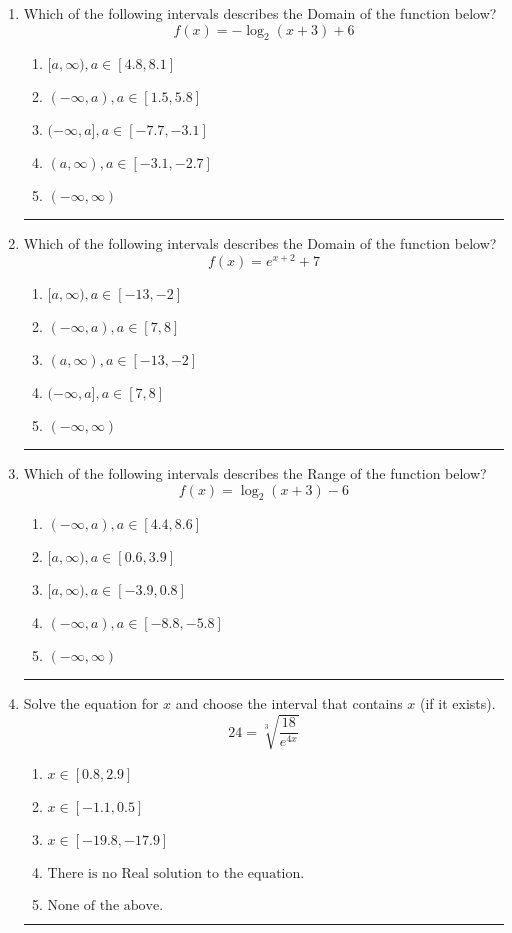 \documentclass[14pt]{extbook}
\newcommand{\litem}[1]{\item#1\hspace*{-1cm}\rule{\textwidth}{0.4pt}}
\begin{document}
\begin{enumerate}
\litem{
Which of the following intervals describes the Domain of the function below?\[ f(x) = -\log_2{(x+3)}+6 \]\begin{enumerate}[label=\Alph*.]
\item \( [a, \infty), a \in [4.8, 8.1] \)
\item \( (-\infty, a), a \in [1.5, 5.8] \)
\item \( (-\infty, a], a \in [-7.7, -3.1] \)
\item \( (a, \infty), a \in [-3.1, -2.7] \)
\item \( (-\infty, \infty) \)

\end{enumerate} }
\litem{
Which of the following intervals describes the Domain of the function below?\[ f(x) = e^{x+2}+7 \]\begin{enumerate}[label=\Alph*.]
\item \( [a, \infty), a \in [-13, -2] \)
\item \( (-\infty, a), a \in [7, 8] \)
\item \( (a, \infty), a \in [-13, -2] \)
\item \( (-\infty, a], a \in [7, 8] \)
\item \( (-\infty, \infty) \)

\end{enumerate} }
\litem{
Which of the following intervals describes the Range of the function below?\[ f(x) = \log_2{(x+3)}-6 \]\begin{enumerate}[label=\Alph*.]
\item \( (-\infty, a), a \in [4.4, 8.6] \)
\item \( [a, \infty), a \in [0.6, 3.9] \)
\item \( [a, \infty), a \in [-3.9, 0.8] \)
\item \( (-\infty, a), a \in [-8.8, -5.8] \)
\item \( (-\infty, \infty) \)

\end{enumerate} }
\litem{
 Solve the equation for $x$ and choose the interval that contains $x$ (if it exists).\[  24 = \sqrt[3]{\frac{18}{e^{4x}}} \]\begin{enumerate}[label=\Alph*.]
\item \( x \in [0.8, 2.9] \)
\item \( x \in [-1.1, 0.5] \)
\item \( x \in [-19.8, -17.9] \)
\item \( \text{There is no Real solution to the equation.} \)
\item \( \text{None of the above.} \)


\end{enumerate}}
\end{enumerate}
\end{document}
